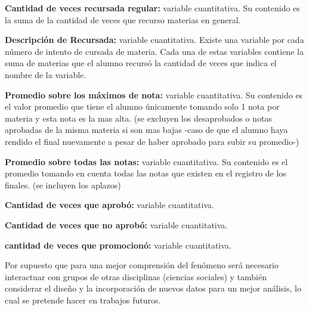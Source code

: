 \vspace{3mm}

\textbf{Cantidad de veces recursada regular:} variable cuantitativa. Su contenido es la suma de la cantidad de veces que recurso materias en general.

\vspace{3mm}

\textbf{Descripción de Recursada:} variable cuantitativa. Existe una variable por cada número de intento de cursada de materia. Cada una de estas variables contiene la suma de materias que el alumno recursó la cantidad de veces que indica el nombre de la variable.

\vspace{3mm}

\textbf{Promedio sobre los máximos de nota:} variable cuantitativa. Su contenido es el valor promedio que tiene el alumno únicamente tomando solo 1 nota por materia y esta nota es la mas alta. (se excluyen los desaprobados o notas aprobadas de la misma materia si son mas bajas -caso de que el alumno haya rendido el final nuevamente a pesar de haber aprobado para subir su promedio-)

\vspace{3mm}

\textbf{Promedio sobre todas las notas:} variable cuantitativa. Su contenido es el promedio tomando en cuenta todas las notas que existen en el registro de los finales. (se incluyen los aplazos)

\vspace{3mm}

\textbf{Cantidad de veces que aprobó:} variable cuantitativa.

\vspace{3mm}

\textbf{Cantidad de veces que no aprobó:} variable cuantitativa.

\vspace{3mm}

\textbf{cantidad de veces que promocionó:} variable cuantitativa.

\vspace{3mm}



Por supuesto que para una mejor comprensión del fenómeno será necesario interactuar con grupos de otras disciplinas (ciencias sociales) y también considerar el diseño y  la incorporación de nuevos datos para un mejor análisis, lo cual se pretende hacer en trabajos futuros.

